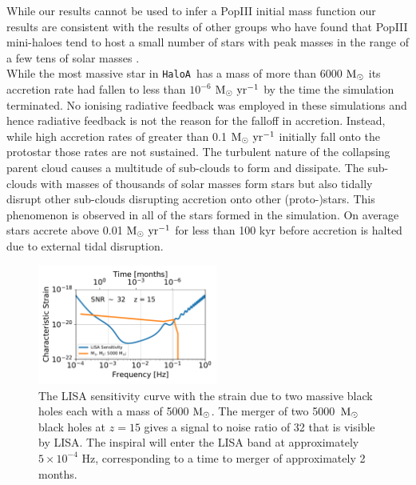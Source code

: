 \documentclass[twocolumn,iop,revtex4]{openjournal}
\newcommand{\msolar} {$\rm{M_{\odot}}~$}
\newcommand{\msolarc} {$\rm{M_{\odot}}$}
\newcommand{\msolaryr} {$\rm{M_{\odot}~yr^{-1}}~$}
\newcommand{\ha} {\texttt{HaloA~}}
\begin{document}
While our results cannot be used to infer a PopIII initial mass function our results
are consistent with the results of other groups who have found that PopIII mini-haloes
tend to host a small number of stars with peak masses in the range of a few tens of
solar masses \citep{Hirano_2014, Susa_2014, Stacy_2016, Skinner_2020}.\\
\indent While the most massive star in \ha has a mass of more than 6000 \msolar its accretion rate had fallen
to less than $10^{-6}$ \msolaryr by the time the simulation terminated. No ionising radiative
feedback was employed in these simulations and hence radiative feedback is not the reason for
the falloff in accretion. Instead, while high accretion rates of greater than 0.1 \msolaryr initially
fall onto the protostar those rates are not sustained. The turbulent nature of the collapsing parent
cloud causes a multitude of sub-clouds to form and dissipate. The sub-clouds with masses of
thousands of solar masses form stars but also tidally disrupt other sub-clouds disrupting
accretion onto other (proto-)stars. This phenomenon is observed in all of the stars formed in the simulation.
On average stars accrete above 0.01 \msolaryr for less than 100 kyr before accretion is halted
due to external tidal disruption. \\
\begin{figure}
   \centering 
\includegraphics[width=0.525\textwidth]{FIGURES/Sensitivity.pdf}
\caption{The LISA sensitivity curve with the strain due to two massive black holes each with a mass
  of 5000 \msolarc. The merger of two 5000~\msolar black holes at $z = 15$ gives a
  signal to noise ratio of 32 that is visible by LISA. The inspiral will enter the LISA band at
  approximately $5 \times 10^{-4}$ Hz, corresponding to a time to merger of approximately 2 months.}
\label{Fig:Sensitivity}
\end{figure}
\end{document}
